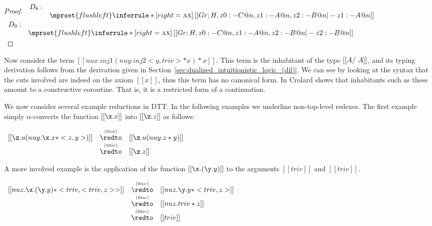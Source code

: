 \begin{proof}
  \begin{math}
    \begin{array}{lcl}
      D_8:\\
      &
      $$\mprset{flushleft}
      \inferrule* [right= \ifrName{ax}] {
        \,
      }{[[Gr;H, z0 :- C @ n, z1 : - A @ n, z2 : - B @ n |- z1 : - A @n ]]}
    \end{array}
  \end{math} \\

  \begin{math}
    \begin{array}{lcl}
      D_9:\\
      &
      $$\mprset{flushleft}
      \inferrule* [right= \ifrName{ax}] {
        \,
      }{[[Gr;H, z0 :- C @ n, z1 : - A @ n, z2 : - B @ n |- z2 : - B @n ]]}
    \end{array}
  \end{math} \\
\end{proof}

Now consider the term $[[nu x . inj 1 (nu y. inj 2 <y,triv> * x) *
x]]$.  This term is the inhabitant of the type $[[A /\- ~A]]$, and its
typing derivation follows from the derivation given in
Section~\ref{sec:dualized_intuitionistic_logic_(dil)}.  We can see by
looking at the syntax that the cuts involved are indeed on the axiom
$[[x]]$, thus this term has no canonical form.  In \cite{Crolard:2004}
Crolard shows that inhabitants such as these amount to a constructive
coroutine.  That is, it is a restricted form of a continuation.

We now consider several example reductions in DTT. In the following
examples we underline non-top-level redexes. The first example simply
$\alpha$-converts the function $[[\x.x]]$ into $[[\z.z]]$ as follows:
\begin{center}
  \begin{math}
    \begin{array}{lcl}    
      [[\z.u(nu y.\x.x * <z , y>)]] & \redtoby{RImp}   & [[\z.u(nu y.z *  y)]]\\
                                    & \redtoby{RRet}   & [[\z.z]]\\
    \end{array}
\end{math}
\end{center}
A more involved example is the application of the function
$[[\x.(\y.y)]]$ to the arguments $[[triv]]$ and $[[triv]]$. 
\begin{center}
  \begin{math}
    \begin{array}{lcl}
      [[nu z.\x.(\y.y) * <triv,<triv,z>>]] & \redtoby{RImp} & [[nu z.\y.y * <triv ,z>]]\\
      & \redtoby{RImp} & [[nu z.triv * z]]\\
      & \redtoby{RRet} & [[triv]]\\
    \end{array}
  \end{math}
\end{center}
